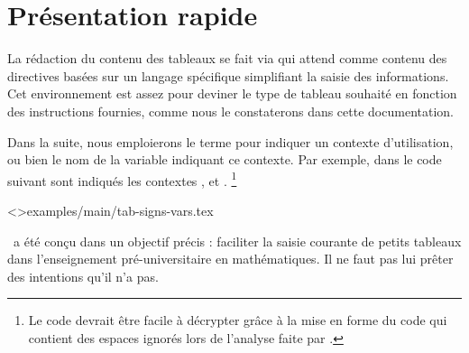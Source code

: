 \documentclass{tutodoc}
\begin{document}
\section{Présentation rapide}

La rédaction du contenu des tableaux se fait via  qui attend comme contenu des directives basées sur un langage spécifique simplifiant la saisie des informations.
Cet environnement est assez  pour deviner le type de tableau souhaité en fonction des instructions fournies, comme nous le constaterons dans cette documentation.


\begin{tdocimp}
	Dans la suite, nous emploierons le terme  pour indiquer un contexte d'utilisation, ou bien le nom de la variable indiquant ce contexte. Par exemple, dans le code suivant sont indiqués les contextes
	,
	et
	.%
	\footnote{
		Le code devrait être facile à décrypter grâce à la mise en forme du code qui contient des espaces ignorés lors de l'analyse faite par \thisproj. 
	}
	
	\tdoclatexinput<>{examples/main/tab-signs-vars.tex}
\end{tdocimp}


\begin{tdoccaut}
	\thisproj\ a été conçu dans un objectif précis : faciliter la saisie courante de petits tableaux dans l'enseignement pré-universitaire en mathématiques. Il ne faut pas lui prêter des intentions qu'il n'a pas. 
\end{tdoccaut}
\end{document}
